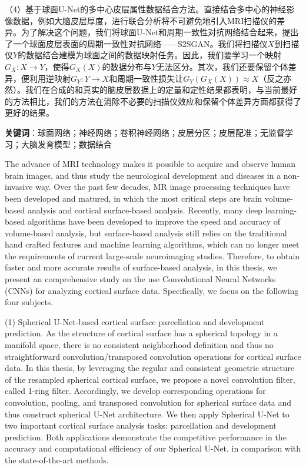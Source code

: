 （4）基于球面U-Net的多中心皮层属性数据结合方法。直接结合多中心的神经影像数据，例如大脑皮层厚度，进行联合分析将不可避免地引入MRI扫描仪的差异。为了解决这个问题，我们将球面U-Net和周期一致性对抗网络结合起来，提出了一个球面皮层表面的周期一致性对抗网络——S2SGAN。我们将扫描仪$X$到扫描仪$Y$的数据结合建模为球面之间的数据映射任务。因此，我们要学习一个映射$G_X:X\rightarrow Y$，使得$G_X(X)$的数据分布与$Y$无法区分。其次，我们还要保留个体差异，便利用逆映射$G_Y:Y\rightarrow X$和周期一致性损失让$G_Y(G_X(X))\approx X$（反之亦然）。我们在合成的和真实的脑皮层数据上的定量和定性结果都表明，与当前最好的方法相比，我们的方法在消除不必要的扫描仪效应和保留个体差异方面都获得了更好的结果。



\textbf{关键词}：球面网络；神经网络；卷积神经网络；皮层分区；皮层配准；无监督学习；大脑发育模型；数据结合






\cleardoublepage
{}
The advance of MRI technology makes it possible to acquire and observe human brain images, and thus study the neurological development and diseases in a non-invasive way. Over the past few decades, MR image processing techniques have been developed and matured, in which the most critical steps are brain volume-based analysis and cortical surface-based analysis. Recently, many deep learning-based algorithms have been developed to improve the speed and accuracy of volume-based analysis, but surface-based analysis still relies on the traditional hand crafted features and machine learning algorithms, which can no longer meet the requirements of current large-scale neuroimaging studies. Therefore, to obtain faster and more accurate results of surface-based analysis, in this thesis, we present an comprehensive study on the use Convolutional Neural Networks (CNNs) for analyzing cortical surface data. Specifically, we focus on the following four subjects.

(1) Spherical U-Net-based cortical surface parcellation and development prediction. As the structure of cortical surface has a spherical topology in a manifold space, there is no consistent neighborhood definition and thus no straightforward convolution/transposed convolution operations for cortical surface data. In this thesis, by leveraging the regular and consistent geometric structure of the resampled spherical cortical surface, we propose a novel convolution filter, called 1-ring filter. Accordingly, we develop corresponding operations for convolution, pooling, and transposed convolution for spherical surface data and thus construct spherical U-Net architecture. We then apply Spherical U-Net to two important cortical surface analysis tasks: parcellation and development prediction. Both applications demonstrate the competitive performance in the accuracy and computational efficiency of our Spherical U-Net, in comparison with the state-of-the-art methods.
 
